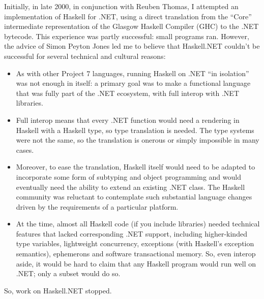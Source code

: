 \documentclass[acmsmall,review]{acmart}\settopmatter{printfolios=true,printccs=false,printacmref=false}
\begin{document}
Initially, in late 2000, in conjunction with Reuben Thomas, I attempted an implementation of Haskell for .NET, using a direct translation from the “Core” intermediate representation of the Glasgow Haskell Compiler (GHC) to the .NET bytecode. This experience was partly successful: small programs ran. However, the advice of Simon Peyton Jones led me to believe that Haskell.NET couldn’t be successful for several technical and cultural reasons: 

\begin{itemize}
\item As with other Project 7 languages, running Haskell on .NET “in isolation” was not enough in itself: a primary goal was to make a functional language that was fully part of the .NET ecosystem, with full interop with .NET libraries. 
\item Full interop means that every .NET function would need a rendering in Haskell with a Haskell type, so type translation is needed. The type systems were not the same, so the translation is onerous or simply impossible in many cases.  
\item Moreover, to ease the translation, Haskell itself would need to be adapted to incorporate some form of subtyping and object programming and would eventually need the ability to extend an existing .NET class.   The Haskell community was reluctant to contemplate such substantial language changes driven by the requirements of a particular platform. 
\item At the time, almost all Haskell code (if you include libraries) needed technical features that lacked corresponding .NET support, including higher-kinded type variables, lightweight concurrency, exceptions (with Haskell’s exception semantics), ephemerons and software transactional memory. So, even interop aside, it would be hard to claim that any Haskell program would run well on .NET; only a subset would do so.   
\end{itemize}
So, work on Haskell.NET stopped.
\end{document}
